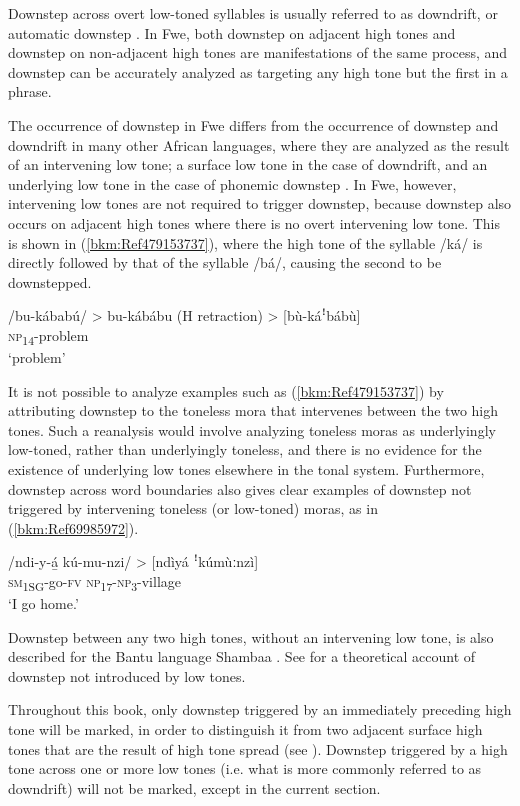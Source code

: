 Downstep across overt low-toned syllables is usually referred to as downdrift, or automatic down\-step \citep{Connell2011}. In Fwe, both downstep on adjacent high tones and downstep on non-adjacent high tones are manifestations of the same process, and downstep can be accurately ana\-lyzed as targeting any high tone but the first in a phrase.

The occurrence of downstep in Fwe differs from the occurrence of downstep and downdrift in many other African languages, where they are analyzed as the result of an interven\-ing low tone; a surface low tone in the case of downdrift, and an underlying low tone in the case of phonemic downstep \citep[148]{Yip2002}. In Fwe, however, intervening low tones are not required to trigger downstep, because downstep also occurs on adjacent high tones where there is no overt intervening low tone. This is shown in (\ref{bkm:Ref479153737}), where the high tone of the syllable /ká/ is directly followed by that of the syllable /bá/, causing the second to be downstepped.

\ea
\label{bkm:Ref479153737}
\gll /bu-kábabú/ > bu-kábábu (H retraction) > [bù-káꜝbábù]\\
\textsc{np}\textsubscript{14}-problem\\
\glt ‘problem’
\z

It is not possible to analyze examples such as (\ref{bkm:Ref479153737}) by attributing downstep to the toneless mora that intervenes between the two high tones. Such a reanalysis would involve analyzing toneless moras as underlyingly low-toned, rather than underlyingly toneless, and there is no evidence for the existence of underlying low tones elsewhere in the tonal system. Furthermore, downstep across word boundaries also gives clear examples of downstep not triggered by intervening toneless (or low-toned) moras, as in (\ref{bkm:Ref69985972}).

\ea
\label{bkm:Ref69985972}
\gll /ndi-y-á̲  kú-mu-nzi/ > [ndìyá ꜝkúmùːnzì]\\
\textsc{sm}\textsubscript{1SG}-go-\textsc{fv}  \textsc{np}\textsubscript{17}-\textsc{np}\textsubscript{3}-village\\
\glt ‘I go home.’
\z

Downstep between any two high tones, without an intervening low tone, is also described for the Bantu language Shambaa \citep{Odden1982}. See {\citet{Odden1986}} for a theoretical account of downstep not introduced by low tones.

Throughout this book, only downstep triggered by an immediately preceding high tone will be marked, in order to distinguish it from two adjacent surface high tones that are the result of high tone spread (see ). Downstep triggered by a high tone across one or more low tones (i.e. what is more commonly referred to as downdrift) will not be marked, except in the current section.

